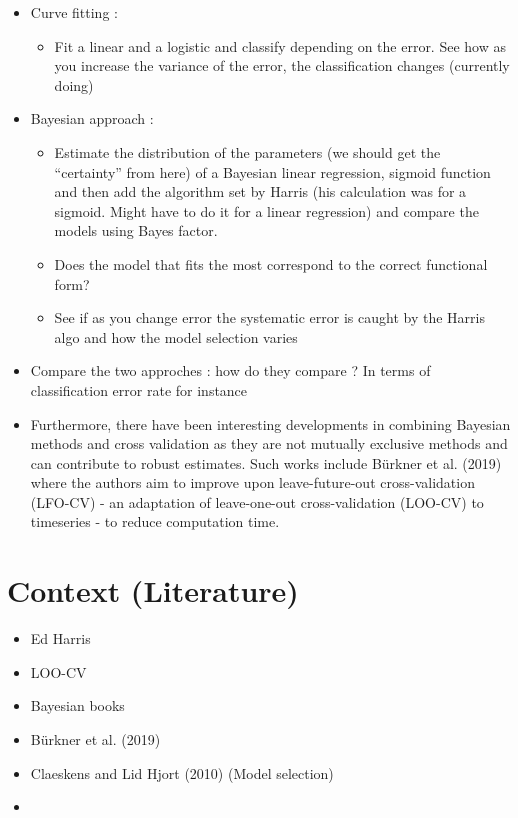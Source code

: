 \documentclass[]{article}
\providecommand{\tightlist}{%
  \setlength{\itemsep}{0pt}\setlength{\parskip}{0pt}}
\begin{document}
\begin{itemize}
\item
  Curve fitting :

  \begin{itemize}
  \tightlist
  \item
    Fit a linear and a logistic and classify depending on the error. See
    how as you increase the variance of the error, the classification
    changes (currently doing)
  \end{itemize}
\item
  Bayesian approach :

  \begin{itemize}
  \item
    Estimate the distribution of the parameters (we should get the
    ``certainty'' from here) of a Bayesian linear regression, sigmoid
    function and then add the algorithm set by Harris (his calculation
    was for a sigmoid. Might have to do it for a linear regression) and
    compare the models using Bayes factor.
  \item
    Does the model that fits the most correspond to the correct
    functional form?
  \item
    See if as you change error the systematic error is caught by the
    Harris algo and how the model selection varies
  \end{itemize}
\item
  Compare the two approches : how do they compare ? In terms of
  classification error rate for instance
\item
  Furthermore, there have been interesting developments in combining
  Bayesian methods and cross validation as they are not mutually
  exclusive methods and can contribute to robust estimates. Such works
  include Bürkner et al. (2019) where the authors aim to improve upon
  leave-future-out cross-validation (LFO-CV) - an adaptation of
  leave-one-out cross-validation (LOO-CV) to timeseries - to reduce
  computation time.
\end{itemize}

\hypertarget{context-literature}{%
\section{Context (Literature)}\label{context-literature}}

\begin{itemize}
\item
  Ed Harris
\item
  LOO-CV
\item
  Bayesian books
\item
  Bürkner et al. (2019)
\item
  Claeskens and Lid Hjort (2010) (Model selection)
\item
\end{itemize}
\end{document}
